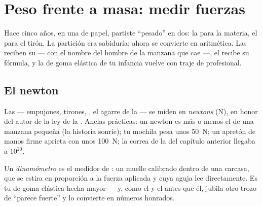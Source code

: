 \chapter{Peso frente a masa: medir fuerzas}\label{ch:g9:weight-vs-mass}

Hace cinco años, en una  de papel, partiste ``pesado'' en dos: la
 para la materia, el  para el tirón. La partición
era sabiduría; ahora se convierte en aritmética. Las
 reciben su  --- con el nombre del hombre de
la manzana que cae ---, el  recibe su fórmula, y la 
de goma elástica de tu infancia vuelve con traje de profesional.

\section{El newton}

\begin{definition}[El newton]\label{def:g9:weight-vs-mass:newton}
Las  --- empujones, tirones, , el agarre de
la  --- se miden en \emph{newtons}
(\unit{N}), en honor del autor de la ley de la
. Anclas prácticas: un newton es más o menos el
 de una manzana pequeña (la historia sonríe); tu mochila
pesa unos \qty{50}{N}; un apretón de manos firme aprieta con unos
\qty{100}{N}; la correa de la  del capítulo anterior llegaba a
$10^{20}$.
\end{definition}

\begin{definition}[Dinamómetro]\label{def:g9:weight-vs-mass:dynamometer}
Un \emph{dinamómetro} es el medidor de : un
muelle calibrado dentro de una carcasa, que se estira en proporción a
la fuerza aplicada y cuya aguja lee 
directamente. Es tu  de goma elástica hecha mayor --- y, como el
 y el  antes que él, jubila otro
trozo de ``parece fuerte'' y lo convierte en números honrados.
\end{definition}


